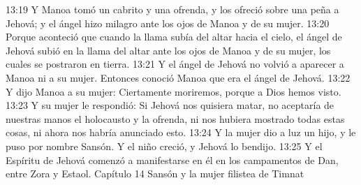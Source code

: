 13:19 Y Manoa tomó un cabrito y una ofrenda, y los ofreció sobre una peña a Jehová; y el ángel hizo milagro ante los ojos de Manoa y de su mujer.  
13:20 Porque aconteció que cuando la llama subía del altar hacia el cielo, el ángel de Jehová subió en la llama del altar ante los ojos de Manoa y de su mujer, los cuales se postraron en tierra.  
13:21 Y el ángel de Jehová no volvió a aparecer a Manoa ni a su mujer. Entonces conoció Manoa que era el ángel de Jehová.  
13:22 Y dijo Manoa a su mujer: Ciertamente moriremos, porque a Dios hemos visto.  
13:23 Y su mujer le respondió: Si Jehová nos quisiera matar, no aceptaría de nuestras manos el holocausto y la ofrenda, ni nos hubiera mostrado todas estas cosas, ni ahora nos habría anunciado esto.  
13:24 Y la mujer dio a luz un hijo, y le puso por nombre Sansón. Y el niño creció, y Jehová lo bendijo.  
13:25 Y el Espíritu de Jehová comenzó a manifestarse en él en los campamentos de Dan, entre Zora y Estaol.  
Capítulo 14
Sansón y la mujer filistea de Timnat  

